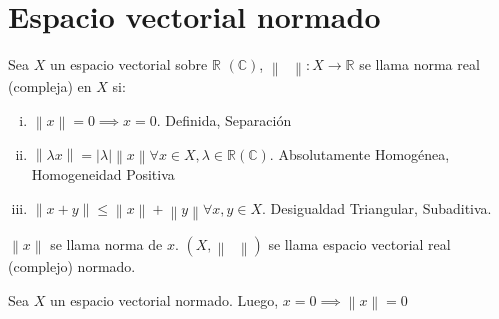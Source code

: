 \section{Espacio vectorial normado}

\begin{definition*}
    Sea $X$ un espacio vectorial sobre
    $\mathbb{R}$ $\left(\mathbb{C}\right)$,
    $\left\|\phantom{\cdot}\right\|\colon X\to\mathbb{R}$
    se llama norma real (compleja) en $X$ si:
    \begin{enumerate}[i)]
        \item

              \begin{math}
                  \left\|x\right\|=
                  0\implies
                  x=
                  0
              \end{math}.
              Definida, Separación

        \item

              \begin{math}
                  \left\|\lambda x\right\|=
                  \left|\lambda\right|
                  \left\|x\right\|
                  \forall x\in X, \lambda\in\mathbb{R}
                  \left(\mathbb{C}\right)
              \end{math}.
              Absolutamente Homogénea,
              Homogeneidad Positiva

        \item

              \begin{math}
                  \left\|x+y\right\|\leq
                  \left\|x\right\|+
                  \left\|y\right\|
                  \forall x, y\in X
              \end{math}.
              Desigualdad Triangular, Subaditiva.
    \end{enumerate}

    $\left\|x\right\|$ se llama norma de $x$.
    $\left(X, \left\|\phantom{\cdot}\right\|\right)$ se
    llama espacio vectorial real (complejo) normado.
\end{definition*}

\begin{proposition*}
    Sea $X$ un espacio vectorial normado.
    Luego,
    \begin{math}
        x=
        0\implies
        \left\|x\right\|=
        0
    \end{math}
\end{proposition*}

